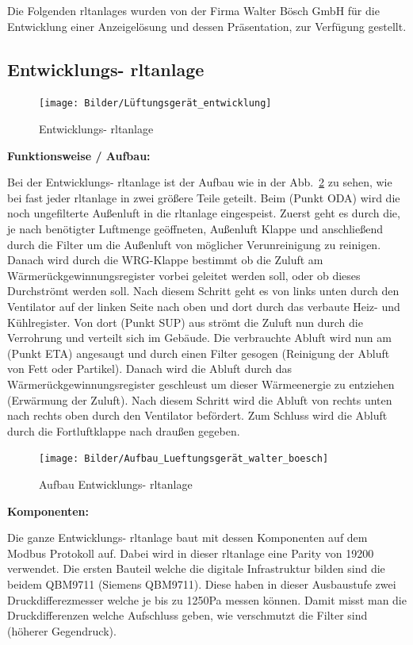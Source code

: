 Die Folgenden \acp{rltanlage} wurden von der Firma Walter Bösch GmbH für die Entwicklung einer Anzeigelösung und dessen Präsentation, zur Verfügung gestellt.

\subsection{Entwicklungs- \ac{rltanlage}}

\begin{figure}[H]
	\centering
	\texttt{[image: Bilder/Lüftungsgerät\_entwicklung]}
	\caption{Entwicklungs- \ac{rltanlage}} 
	\label{fig:LG_entwicklung}
\end{figure}

\textbf{Funktionsweise / Aufbau:}

Bei der Entwicklungs- \ac{rltanlage} ist der Aufbau wie in der Abb.~\ref{fig:Bauplan_entwicklung} zu sehen, wie bei fast jeder \ac{rltanlage} in zwei größere Teile geteilt.
Beim (Punkt ODA) wird die noch ungefilterte Außenluft in die \ac{rltanlage} eingespeist. Zuerst geht es durch die, je nach benötigter Luftmenge geöffneten, Außenluft Klappe und anschließend durch die Filter um die Außenluft von möglicher Verunreinigung zu reinigen. Danach wird durch die WRG-Klappe bestimmt ob die Zuluft am Wärmerückgewinnungsregister vorbei geleitet werden soll, oder ob dieses Durchströmt werden soll. Nach diesem Schritt geht es von links unten durch den Ventilator auf der linken Seite nach oben und dort durch das verbaute Heiz- und Kühlregister. Von dort (Punkt SUP) aus strömt die Zuluft nun durch die Verrohrung und verteilt sich im Gebäude. Die verbrauchte Abluft wird nun am (Punkt ETA) angesaugt und durch einen Filter gesogen (Reinigung der Abluft von \zB Fett oder Partikel). Danach wird die Abluft durch das Wärmerückgewinnungsregister geschleust um dieser Wärmeenergie zu entziehen (Erwärmung der Zuluft). Nach diesem Schritt wird die Abluft von rechts unten nach rechts oben durch den Ventilator befördert. Zum Schluss wird die Abluft durch die Fortluftklappe nach draußen gegeben. 

\begin{figure}[H]
	\centering
	\texttt{[image: Bilder/Aufbau\_Lueftungsgerät\_walter\_boesch]}
	\caption{Aufbau Entwicklungs- \ac{rltanlage}} 
	\label{fig:Bauplan_entwicklung}
\end{figure}


\textbf{Komponenten:}

Die ganze Entwicklungs- \ac{rltanlage} baut mit dessen Komponenten auf dem Modbus Protokoll auf. Dabei wird in dieser \ac{rltanlage} eine Parity von 19200 verwendet. Die ersten Bauteil welche die digitale Infrastruktur bilden sind die beidem QBM9711 (Siemens QBM9711). Diese haben in dieser Ausbaustufe zwei Druckdifferezmesser welche je bis zu 1250Pa messen können. Damit misst man die Druckdifferenzen welche Aufschluss geben, wie verschmutzt die Filter sind (höherer Gegendruck).

